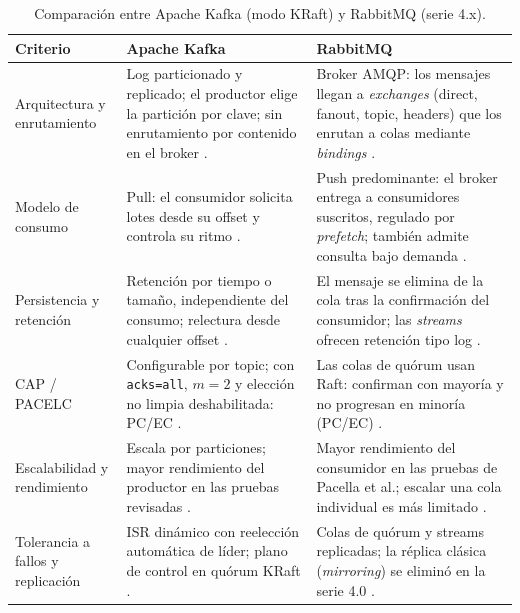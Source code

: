 \documentclass[11pt,a4paper]{article}
\begin{document}
\begin{table}[H]
\centering
\small
\caption{Comparación entre Apache Kafka (modo KRaft) y RabbitMQ (serie 4.x).}
\label{tab:comparativa}
\renewcommand{\arraystretch}{1.25}
\begin{tabular}{>{\raggedright\arraybackslash}p{2.9cm} >{\raggedright\arraybackslash}p{5.9cm} >{\raggedright\arraybackslash}p{5.9cm}}
\toprule
\textbf{Criterio} & \textbf{Apache Kafka} & \textbf{RabbitMQ} \\
\midrule
Arquitectura y enrutamiento & Log particionado y replicado; el productor elige la partición por clave; sin enrutamiento por contenido en el broker \cite{raptis2023survey,kafkadocs}. & Broker AMQP: los mensajes llegan a \emph{exchanges} (direct, fanout, topic, headers) que los enrutan a colas mediante \emph{bindings} \cite{rabbitmqamqp}. \\
\addlinespace
Modelo de consumo & Pull: el consumidor solicita lotes desde su offset y controla su ritmo \cite{raptis2023survey,kafkadocs}. & Push predominante: el broker entrega a consumidores suscritos, regulado por \emph{prefetch}; también admite consulta bajo demanda \cite{rabbitmqamqp,pacella2025scalable}. \\
\addlinespace
Persistencia y retención & Retención por tiempo o tamaño, independiente del consumo; relectura desde cualquier offset \cite{kafkadocs}. & El mensaje se elimina de la cola tras la confirmación del consumidor; las \emph{streams} ofrecen retención tipo log \cite{rabbitmqquorum}. \\
\addlinespace
CAP / PACELC & Configurable por topic; con \texttt{acks=all}, $m=2$ y elección no limpia deshabilitada: PC/EC \cite{kafkadocs,abadi2012consistency}. & Las colas de quórum usan Raft: confirman con mayoría y no progresan en minoría (PC/EC) \cite{rabbitmqquorum}. \\
\addlinespace
Escalabilidad y rendimiento & Escala por particiones; mayor rendimiento del productor en las pruebas revisadas \cite{pacella2025scalable,maharjan2023benchmarking}. & Mayor rendimiento del consumidor en las pruebas de Pacella et al.; escalar una cola individual es más limitado \cite{pacella2025scalable}. \\
\addlinespace
Tolerancia a fallos y replicación & ISR dinámico con reelección automática de líder; plano de control en quórum KRaft \cite{zhou2024distributed,kip500}. & Colas de quórum y streams replicadas; la réplica clásica (\emph{mirroring}) se eliminó en la serie 4.0 \cite{rabbitmqquorum}. \\
\bottomrule
\end{tabular}
\end{table}
\end{document}

